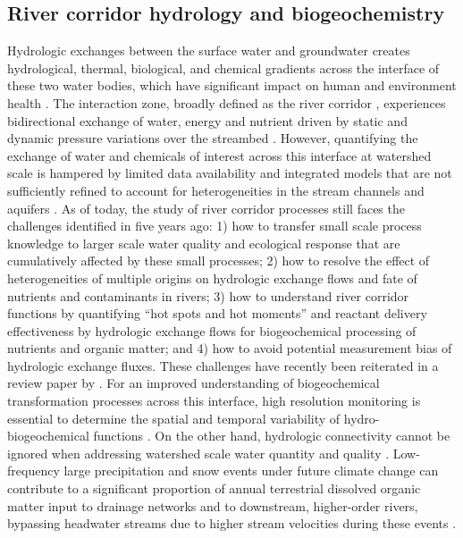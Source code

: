 \documentclass[preprint,review, 12pt]{elsarticle}
\begin{document}
\subsection{River corridor hydrology and biogeochemistry}

Hydrologic exchanges between the surface water and groundwater creates hydrological, thermal, biological, and chemical gradients across the interface of these two water bodies, which have significant impact on human and environment health \citep{Bobba2012,Conant2019}. The interaction zone, broadly defined as the river corridor \citep{Harvey2015b}, experiences bidirectional exchange of water, energy and nutrient driven by static and dynamic pressure variations over the streambed \citep{Grant2018}. However, quantifying the exchange of water and chemicals of interest across this interface at watershed scale is hampered by limited data availability and integrated models that are not sufficiently refined to account for heterogeneities in the stream channels and aquifers \citep{Barthel2016}. As of today, the study of river corridor processes still faces the challenges identified in \cite{Harvey2015b} five years ago: 1) how to transfer small scale process knowledge to larger scale water quality and ecological response that are cumulatively affected by these small processes; 2) how to resolve the effect of heterogeneities of multiple origins on hydrologic exchange flows and fate of nutrients and contaminants in rivers; 3) how to understand river corridor functions by quantifying “hot spots and hot moments” and reactant delivery effectiveness by hydrologic exchange flows for biogeochemical processing of nutrients and organic matter; and 4) how to avoid potential measurement bias of hydrologic exchange fluxes.  These challenges have recently been reiterated in a review paper by \cite{ward2019}. For an improved understanding of biogeochemical transformation processes across this interface, high resolution monitoring is essential to determine the spatial and temporal variability of hydro-biogeochemical functions \citep{Gassen2017}. On the other hand, hydrologic connectivity cannot be ignored when addressing watershed scale water quantity and quality \citep{Freeman2007,harvey2019connectivity}.  Low-frequency large precipitation and snow events under future climate change can contribute to a significant proportion of annual terrestrial dissolved organic matter input to drainage networks and to downstream, higher-order rivers, bypassing headwater streams due to higher stream velocities during these events \citep{Raymond2016}.
\end{document}
